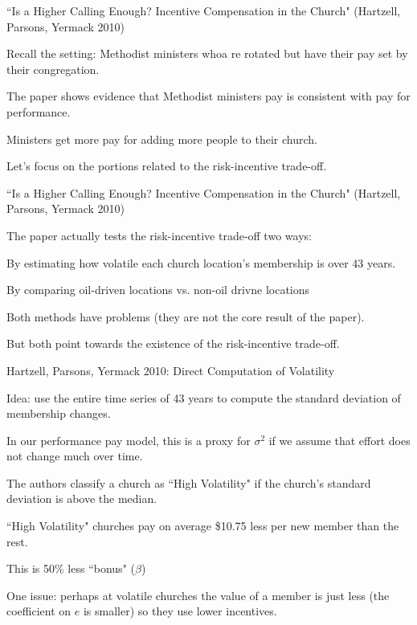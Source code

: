 \documentclass[aspectratio=169,usenames,dvipsnames]{beamer}
\newenvironment{wideitemize}{\itemize\addtolength{\itemsep}{10pt}}{\enditemize}
\begin{document}
\begin{frame}{``Is a Higher Calling Enough? Incentive Compensation in the Church" (Hartzell, Parsons, Yermack 2010)}

\begin{wideitemize}
    \item Recall the setting: Methodist ministers whoa re rotated but have their pay set by their congregation.
    \item The paper shows evidence that Methodist ministers pay is consistent with pay for performance.
    \item Ministers get more pay for adding more people to their church.
    \item Let's focus on the portions related to the risk-incentive trade-off.
\end{wideitemize}
\end{frame}

\begin{frame}{``Is a Higher Calling Enough? Incentive Compensation in the Church" (Hartzell, Parsons, Yermack 2010)}

\begin{wideitemize}
    \item The paper actually tests the risk-incentive trade-off two ways:
    \begin{wideitemize}
        \item By estimating how volatile each church location's membership is over 43 years.
        \item By comparing oil-driven locations vs. non-oil drivne locations
    \end{wideitemize}
    \item Both methods have problems (they are not the core result of the paper).
    \item But both point towards the existence of the risk-incentive trade-off.
\end{wideitemize}
\end{frame}

\begin{frame}{Hartzell, Parsons, Yermack 2010: Direct Computation of Volatility}

\begin{wideitemize}
    \item Idea: use the entire time series of 43 years to compute the standard deviation of membership changes.
    \item In our performance pay model, this is a proxy for $\sigma^2$ if we assume that effort does not change much over time.
    \item The authors classify a church as ``High Volatility" if the church's standard deviation is above the median.
    \item ``High Volatility" churches pay on average \$10.75 less per new member than the rest.
    \item This is 50\% less ``bonus" ($\beta$)
    \item One issue: perhaps at volatile churches the value of a member is just less (the coefficient on $e$ is smaller) so they use lower incentives.    
\end{wideitemize}
\end{frame}
\end{document}
